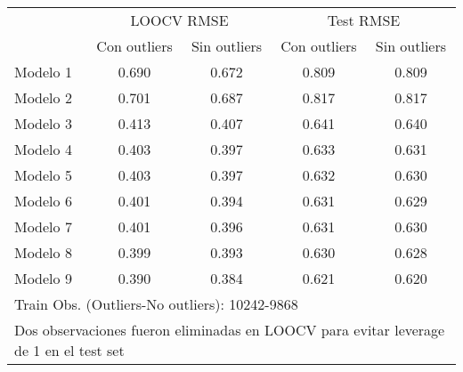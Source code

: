 \centering
\begin{tabular}{lcccc}
\toprule
\multicolumn{1}{c}{} & \multicolumn{2}{c}{LOOCV RMSE} & \multicolumn{2}{c}{Test RMSE} \\
\cmidrule(l{3pt}r{3pt}){2-3} \cmidrule(l{3pt}r{3pt}){4-5}
 & Con outliers & Sin outliers & Con outliers & Sin outliers\\
\midrule
Modelo 1 & 0.690 & 0.672 & 0.809 & 0.809\\
Modelo 2 & 0.701 & 0.687 & 0.817 & 0.817\\
Modelo 3 & 0.413 & 0.407 & 0.641 & 0.640\\
Modelo 4 & 0.403 & 0.397 & 0.633 & 0.631\\
Modelo 5 & 0.403 & 0.397 & 0.632 & 0.630\\
\addlinespace
Modelo 6 & 0.401 & 0.394 & 0.631 & 0.629\\
Modelo 7 & 0.401 & 0.396 & 0.631 & 0.630\\
Modelo 8 & 0.399 & 0.393 & 0.630 & 0.628\\
Modelo 9 & 0.390 & 0.384 & 0.621 & 0.620\\
\bottomrule
\multicolumn{5}{l}{\rule{0pt}{1em}Train Obs. (Outliers-No outliers): 10242-9868}\\
\multicolumn{5}{l}{\rule{0pt}{1em}Dos observaciones fueron eliminadas en LOOCV para evitar leverage de 1 en el test set}\\
\end{tabular}
